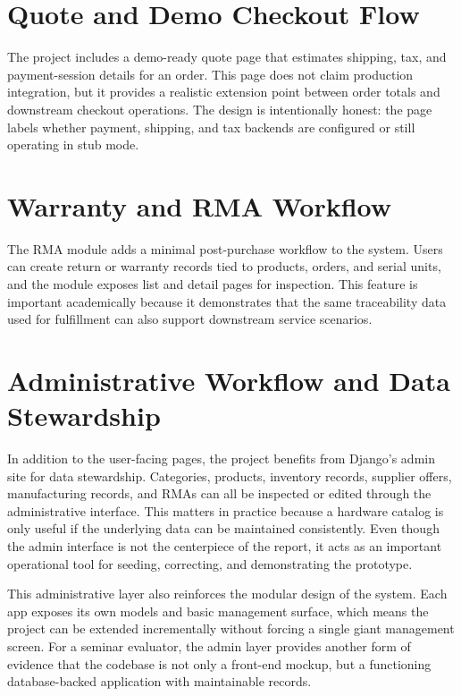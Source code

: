 \documentclass[12pt,letterpaper,oneside,openany]{book}
\begin{document}
\section{Quote and Demo Checkout Flow}

\begin{justifying}
The project includes a demo-ready quote page that estimates shipping, tax, and
payment-session details for an order. This page does not claim production
integration, but it provides a realistic extension point between order totals
and downstream checkout operations. The design is intentionally honest: the
page labels whether payment, shipping, and tax backends are configured or still
operating in stub mode.
\end{justifying}

\section{Warranty and RMA Workflow}

\begin{justifying}
The RMA module adds a minimal post-purchase workflow to the system. Users can
create return or warranty records tied to products, orders, and serial units,
and the module exposes list and detail pages for inspection. This feature is
important academically because it demonstrates that the same traceability data
used for fulfillment can also support downstream service scenarios.
\end{justifying}

\section{Administrative Workflow and Data Stewardship}

\begin{justifying}
In addition to the user-facing pages, the project benefits from Django's admin
site for data stewardship. Categories, products, inventory records, supplier
offers, manufacturing records, and RMAs can all be inspected or edited through
the administrative interface. This matters in practice because a hardware
catalog is only useful if the underlying data can be maintained consistently.
Even though the admin interface is not the centerpiece of the report, it acts
as an important operational tool for seeding, correcting, and demonstrating the
prototype.
\end{justifying}

\begin{justifying}
This administrative layer also reinforces the modular design of the system.
Each app exposes its own models and basic management surface, which means the
project can be extended incrementally without forcing a single giant management
screen. For a seminar evaluator, the admin layer provides another form of
evidence that the codebase is not only a front-end mockup, but a functioning
database-backed application with maintainable records.
\end{justifying}
\end{document}
